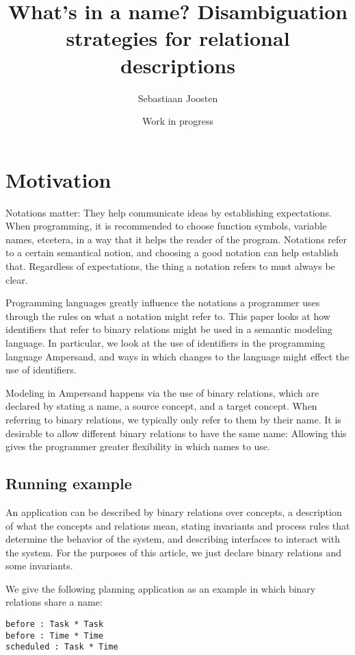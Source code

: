 \documentclass[12pt]{article}
\begin{document}
\title{What's in a name? Disambiguation strategies for relational descriptions}
\author{Sebastiaan Joosten}
\date{Work in progress}
\maketitle

\section{Motivation}
Notations matter: They help communicate ideas by establishing expectations.
When programming, it is recommended to choose function symbols, variable names, etcetera, in a way that it helps the reader of the program.
Notations refer to a certain semantical notion, and choosing a good notation can help establish that.
Regardless of expectations, the thing a notation refers to must always be clear.

Programming languages greatly influence the notations a programmer uses through the rules on what a notation might refer to.
This paper looks at how identifiers that refer to binary relations might be used in a semantic modeling language.
In particular, we look at the use of identifiers in the programming language Ampersand, and ways in which changes to the language might effect the use of identifiers.

Modeling in Ampersand happens via the use of binary relations, which are declared by stating a name, a source concept, and a target concept.
When referring to binary relations, we typically only refer to them by their name.
It is desirable to allow different binary relations to have the same name:
Allowing this gives the programmer greater flexibility in which names to use.

\subsection{Running example}
An application can be described by binary relations over concepts, a description of what the concepts and relations mean, stating invariants and process rules that determine the behavior of the system, and describing interfaces to interact with the system.
For the purposes of this article, we just declare binary relations and some invariants.

We give the following planning application as an example in which binary relations share a name:
\begin{verbatim}
before : Task * Task
before : Time * Time
scheduled : Task * Time
\end{verbatim}
\end{document}
